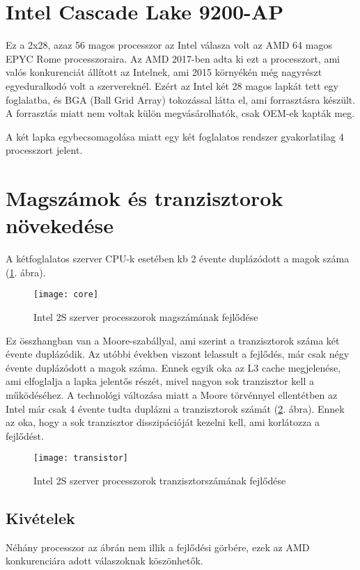 \section{Intel Cascade Lake 9200-AP}
Ez a 2x28, azaz 56 magos processzor az Intel válasza volt az AMD 64 magos EPYC Rome processzoraira.
Az AMD 2017-ben adta ki ezt a processzort, ami valós konkurenciát állított az Intelnek, ami 2015 környékén még nagyrészt egyeduralkodó volt a szervereknél.
Ezért az Intel két 28 magos lapkát tett egy foglalatba, és BGA (Ball Grid Array) tokozással látta el, ami forrasztásra készült.
A forrasztás miatt nem voltak külön megvásárolhatók, csak OEM-ek kapták meg.

A két lapka egybecsomagolása miatt egy két foglalatos rendszer gyakorlatilag 4 processzort jelent.

\section{Magszámok és tranzisztorok növekedése}
A kétfoglalatos szerver CPU-k esetében kb 2 évente duplázódott a magok száma (\ref{fig:core}. ábra).

\begin{figure}[H]
    \texttt{[image: core]}
    \centering
    \caption{Intel 2S szerver processzorok magszámának fejlődése}
    \label{fig:core}
\end{figure}

Ez összhangban van a Moore-szabállyal, ami szerint a tranzisztorok száma két évente duplázódik.
Az utóbbi években viszont lelassult a fejlődés, már csak négy évente duplázódott a magok száma.
Ennek egyik oka az L3 cache megjelenése, ami elfoglalja a lapka jelentős részét, mivel nagyon sok tranzisztor kell a működéséhez.
A technológi változása miatt a Moore törvénnyel ellentétben az Intel már csak 4 évente tudta duplázni a tranzisztorok számát (\ref{fig:transistor}. ábra).
Ennek az oka, hogy a sok tranzisztor disszipációját kezelni kell, ami korlátozza a fejlődést.

\begin{figure}[H]
    \texttt{[image: transistor]}
    \centering
    \caption{Intel 2S szerver processzorok tranzisztorszámának fejlődése}
    \label{fig:transistor}
\end{figure}

\subsection{Kivételek}
Néhány processzor az ábrán nem illik a fejlődési görbére, ezek az AMD konkurenciára adott válaszoknak köszönhetők.

